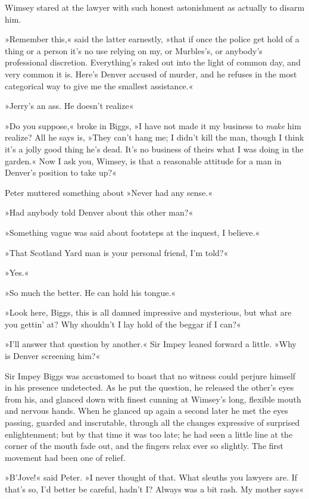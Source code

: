 Wimsey stared at the lawyer with such honest astonishment as actually to disarm him.

»Remember this,« said the latter earnestly, »that if once the police get hold of a thing or a person it's no use relying on my, or Murbles's, or anybody's professional discretion. Everything's raked out into the light of common day, and very common it is. Here's Denver accused of murder, and he refuses in the most categorical way to give me the smallest assistance.«

»Jerry's an ass. He doesn't realize\longdash«

»Do you suppose,« broke in Biggs, »I have not made it my business to \textit{make} him realize? All he says is, »They can't hang me; I didn't kill the man, though I think it's a jolly good thing he's dead. It's no business of theirs what I was doing in the garden.« Now I ask you, Wimsey, is that a reasonable attitude for a man in Denver's position to take up?«

Peter muttered something about »Never had any sense.«

»Had anybody told Denver about this other man?«

»Something vague was said about footsteps at the inquest, I believe.«

»That Scotland Yard man is your personal friend, I'm told?«

»Yes.«

»So much the better. He can hold his tongue.«

»Look here, Biggs, this is all damned impressive and mysterious, but what are you gettin' at? Why shouldn't I lay hold of the beggar if I can?«

»I'll answer that question by another.« Sir Impey leaned forward a little. »Why is Denver screening him?«

Sir Impey Biggs was accustomed to boast that no witness could perjure himself in his presence undetected. As he put the question, he released the other's eyes from his, and glanced down with finest cunning at Wimsey's long, flexible mouth and nervous hands. When he glanced up again a second later he met the eyes passing, guarded and inscrutable, through all the changes expressive of surprised enlightenment; but by that time it was too late; he had seen a little line at the corner of the mouth fade out, and the fingers relax ever so slightly. The first movement had been one of relief.

»B'Jove!« said Peter. »I never thought of that. What sleuths you lawyers are. If that's so, I'd better be careful, hadn't I? Always was a bit rash. My mother says\longdash«

